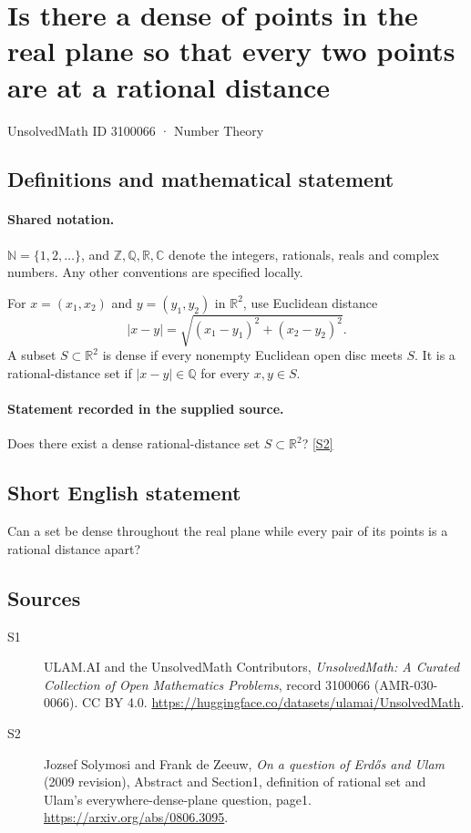 \documentclass[11pt]{article}
\newcommand{\sref}[2]{\hyperlink{source:#1:#2}{[S#2]}}
\begin{document}
\setcounter{section}{3100065}
\section{Is there a dense of points in the real plane so that every two points are at a rational distance}\label{3100066}
{\small\sffamily UnsolvedMath ID 3100066 · Number Theory}
\subsection{Definitions and mathematical statement}

\paragraph{Shared notation.}$\mathbb N=\{1,2,\ldots\}$, and $\mathbb Z,\mathbb Q,\mathbb R,\mathbb C$ denote the integers, rationals, reals and complex numbers. Any other conventions are specified locally.


For $x=(x_1,x_2)$ and $y=(y_1,y_2)$ in $\mathbb R^2$, use Euclidean distance
\[|x-y|=\sqrt{(x_1-y_1)^2+(x_2-y_2)^2}.\]
A subset $S\subset\mathbb R^2$ is dense if every nonempty Euclidean open disc meets $S$. It is a rational-distance set if $|x-y|\in\mathbb Q$ for every $x,y\in S$.

\paragraph{Statement recorded in the supplied source.}
Does there exist a dense rational-distance set $S\subset\mathbb R^2$? \sref{3100066}{2}

\subsection{Short English statement}
Can a set be dense throughout the real plane while every pair of its points is a rational distance apart?
\subsection{Sources}
\begin{description}
\item[\hypertarget{source:3100066:1}{S1}] ULAM.AI and the UnsolvedMath Contributors, \emph{UnsolvedMath: A Curated Collection of Open Mathematics Problems}, record 3100066 (AMR-030-0066). CC BY 4.0. \url{https://huggingface.co/datasets/ulamai/UnsolvedMath}.
\item[\hypertarget{source:3100066:2}{S2}] Jozsef Solymosi and Frank de Zeeuw, \emph{On a question of Erdős and Ulam} (2009 revision), Abstract and Section1, definition of rational set and Ulam’s everywhere-dense-plane question, page1. \url{https://arxiv.org/abs/0806.3095}.
\end{description}
\label{end:3100066}
\end{document}
